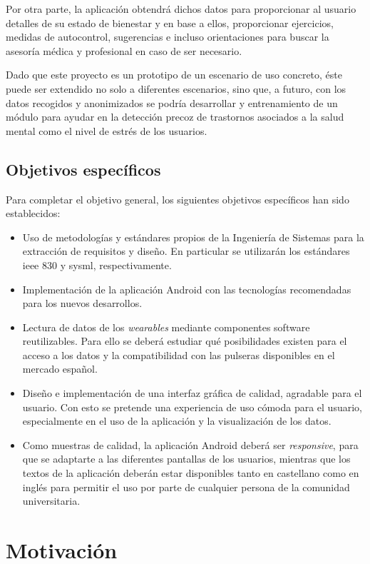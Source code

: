     Por otra parte, la aplicación obtendrá dichos datos para proporcionar al usuario detalles de su estado de bienestar y en base a ellos, proporcionar ejercicios, medidas de autocontrol, sugerencias e incluso orientaciones para buscar la asesoría médica y profesional en caso de ser necesario.

Dado que este proyecto es un prototipo de un escenario de uso concreto, éste puede ser extendido no solo a diferentes escenarios, sino que, a futuro, con los datos recogidos y anonimizados se podría
desarrollar y entrenamiento de un módulo para ayudar en la detección precoz de trastornos asociados a la salud mental como el nivel de estrés de los usuarios.

    \subsection{Objetivos específicos}
    Para completar el objetivo general, los siguientes objetivos específicos han sido establecidos:
    \begin{itemize}
        \item Uso de metodologías y estándares propios de la Ingeniería de Sistemas para la extracción de requisitos y diseño. En particular se utilizarán los estándares \gls{ieee} 830 y \gls{sysml}, respectivamente.
        \item Implementación de la aplicación Android con las tecnologías recomendadas para los nuevos desarrollos. 
        \item Lectura de datos de los \textit{\glspl{wearable}} mediante componentes software reutilizables. Para ello se deberá estudiar qué posibilidades existen para el acceso a los datos y la compatibilidad con las pulseras disponibles en el mercado español.
        \item Diseño e implementación de una interfaz gráfica de calidad, agradable para el usuario. Con esto se pretende una experiencia de uso cómoda para el usuario, especialmente en el uso de la aplicación y la visualización de los datos. 
        \item Como muestras de calidad, la aplicación Android deberá ser \textit{responsive}, para que se adaptarte a las diferentes pantallas de los usuarios, mientras que los textos de la aplicación deberán estar disponibles tanto en castellano como en inglés para permitir el uso por parte de cualquier persona de la comunidad universitaria.
    \end{itemize}

\section{Motivación}

